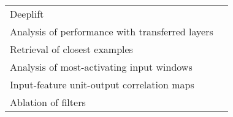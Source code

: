 \begin{tabular}{ll}
Deeplift                                               &                                                                                                                                                                                \cite{Lawhern2018} \\
Analysis of performance with transferred layers        &                                                                                                                                                                            \cite{Hajinoroozi2017} \\
Retrieval of closest examples                          &                                                                                                                                                                                  \cite{Deiss2018} \\
Analysis of most-activating input windows              &                                                                                                                                                                              \cite{Hartmann2018b} \\
Input-feature unit-output correlation maps             &                                                                                                                                                                          \cite{Schirrmeister2017} \\
Ablation of filters                                    &                                                                                                                                                                                \cite{Lawhern2018} \\
\bottomrule
\end{tabular}

